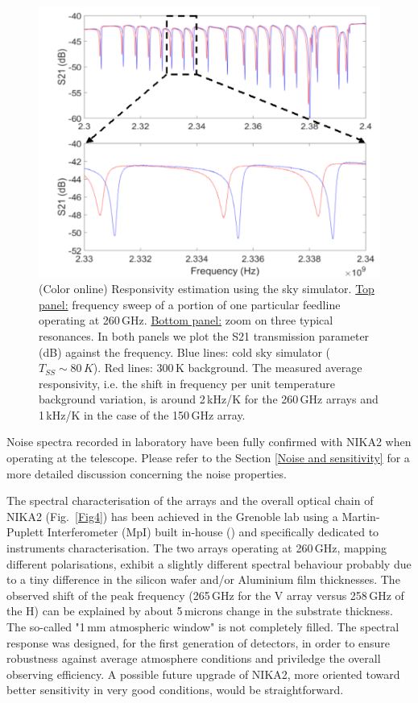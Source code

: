 \documentclass[]{aa} %
\begin{document}
\begin{figure}[h]
\begin{center}
   \centering
    \includegraphics[width=1.0\linewidth]{260GHz-H_sky.png}
    \caption{(Color online) Responsivity estimation using the sky simulator. \underline{Top panel:} frequency sweep of a portion of one particular feedline operating at 260\,GHz. \underline{Bottom panel:} zoom on three typical resonances. In both panels we plot the S21 transmission parameter (dB) against the frequency. Blue lines: cold sky simulator ($T_{SS} \sim 80\,K$). Red lines: 300\,K background. The measured average responsivity, i.e. the shift in frequency per unit temperature background variation, is around 2\,kHz/K for the 260\,GHz arrays and 1\,kHz/K in the case of the 150\,GHz array.}
         \label{Shift_f}
\end{center}
\end{figure}

Noise spectra recorded in laboratory have been fully confirmed with NIKA2 when operating at the telescope. Please refer to the Section \ref{Noise and sensitivity} for a more detailed discussion concerning the noise properties. 

The spectral characterisation of the arrays and the overall optical chain of NIKA2 (Fig.~\ref{Fig4}) has been achieved in the Grenoble lab using a Martin-Puplett Interferometer (MpI) built in-house (\cite{Durand2008}) and specifically dedicated to instruments characterisation. The two arrays operating at 260\,GHz, mapping different polarisations, exhibit a slightly different spectral behaviour probably due to a tiny difference in the silicon wafer and/or Aluminium film thicknesses. The observed shift of the peak frequency (265\,GHz for the V array versus 258\,GHz of the H) can be explained by about 5\,microns change in the substrate thickness. The so-called "1\,mm atmospheric window" is not completely filled. The spectral response was designed, for the first generation of detectors, in order to ensure robustness against average atmosphere conditions and priviledge the overall observing efficiency. A possible future upgrade of NIKA2, more oriented toward better sensitivity in very good conditions, would be straightforward. 
\end{document}
